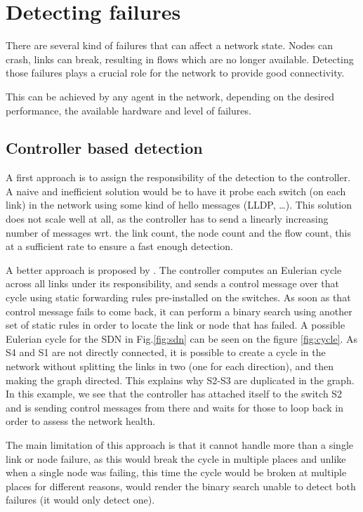 \documentclass[final]{IEEEtran}
\begin{document}
\section{Detecting failures}
There are several kind of failures that can affect a network state. Nodes can crash, links can break, resulting in flows which are no longer available. Detecting those failures plays a crucial role for the network to provide good connectivity.

This can be achieved by any agent in the network, depending on the desired performance, the available hardware and level of failures.

\subsection{Controller based detection}
A first approach is to assign the responsibility of the detection to the controller. A naive and inefficient solution would be to have it probe each switch (on each link) in the network using some kind of hello messages (LLDP\cite{5409813}, \ldots). This solution does not scale well at all\cite{6364688}, as the controller has to send a linearly increasing number of messages wrt. the link count, the node count and the flow count, this at a sufficient rate to ensure a fast enough detection.

A better approach is proposed by \cite{2013arXiv1308.4465K}. The controller computes an Eulerian cycle across all links under its responsibility, and sends a control message over that cycle using static forwarding rules pre-installed on the switches. As soon as that control message fails to come back, it can perform a binary search using another set of static rules in order to locate the link or node that has failed. A possible Eulerian cycle for the SDN in Fig.\ref{fig:sdn} can be seen on the figure \ref{fig:cycle}. As S4 and S1 are not directly connected, it is possible to create a cycle in the network without splitting the links in two (one for each direction), and then making the graph directed. This explains why S2-S3 are duplicated in the graph. In this example, we see that the controller has attached itself to the switch S2 and is sending control messages from there and waits for those to loop back in order to assess the network health.

The main limitation of this approach is that it cannot handle more than a single link or node failure, as this would break the cycle in multiple places and unlike when a single node was failing, this time the cycle would be broken at multiple places for different reasons, would render the binary search unable to detect both failures (it would only detect one).
\end{document}
